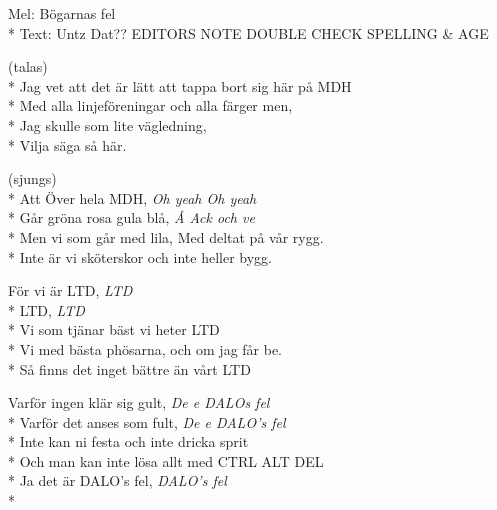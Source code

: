 

\pagestyle{Föreningssånger}

\begin{SongText}
    \begin{SongInfo}
        Mel: Bögarnas fel\\*%
        Text: Untz Dat?? EDITORS NOTE DOUBLE CHECK SPELLING \& AGE
    \end{SongInfo}
    \begin{SongVerse}
        (talas)\\*%
        Jag vet att det är lätt att tappa bort sig här på MDH\\*%
        Med alla linjeföreningar och alla färger men, \\*%
        Jag skulle som lite vägledning, \\*%
        Vilja säga så här.
    \end{SongVerse}
    \begin{SongVerse}
        (sjungs)\\*%
        Att Över hela MDH, \textit{Oh yeah Oh yeah}\\*%
        Går gröna rosa gula blå, \textit{Å Ack och ve}\\*%
        Men vi som går med lila, Med deltat på vår rygg.\\*%
        Inte är vi sköterskor och inte heller bygg.
    \end{SongVerse}
    \begin{SongVerse}
        För vi är LTD, \textit{LTD}\\*%
        LTD, \textit{LTD}\\*%
        Vi som tjänar bäst vi heter LTD\\*%
        Vi med bästa phösarna, och om jag får be.\\*%
        Så finns det inget bättre än vårt LTD
    \end{SongVerse}
    \begin{SongVerse}
        Varför ingen klär sig gult, \textit{De e DALOs fel}\\*%
        Varför det anses som fult, \textit{De e DALO's fel}\\*%
        Inte kan ni festa och inte dricka sprit\\*%
        Och man kan inte lösa allt med CTRL ALT DEL\\*%
        Ja det är DALO's fel, \textit{DALO's fel} \\*%

\end{SongVerse}
\end{SongText}
